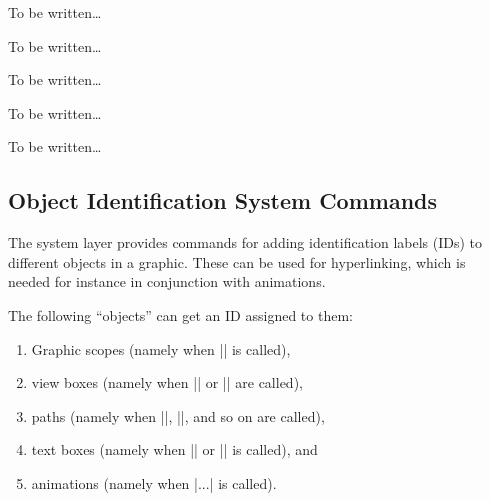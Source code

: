 \begin{command}{\pgfsys@animation@path{}}
  To be written\dots
\end{command}

\begin{command}{\pgfsys@animation@translate{}}
  To be written\dots
\end{command}

\begin{command}{\pgfsys@animation@scale{}}
  To be written\dots
\end{command}

\begin{command}{\pgfsys@animation@rotate{}}
  To be written\dots
\end{command}

\begin{command}{\pgfsys@animation@viewbox{}}
  To be written\dots
\end{command}





\subsection{Object Identification System Commands}
\label{section-sys-id}

The system layer provides commands for adding identification labels
(IDs) to different objects in a graphic. These can be used for
hyperlinking, which is needed for instance in conjunction with
animations.

The following ``objects'' can get an ID assigned to them:
\begin{enumerate}
\item Graphic scopes (namely when |\pgfsys@begin@idscope| is called),
\item view boxes (namely when |\pgfsys@viewboxmeet| or |\pgfsys@viewboxslice| are called),
\item paths (namely when |\pgfsys@fill|, |\pgfsys@stroke|, and so on are called),
\item text boxes (namely when |\pgfsys@hbox| or |\pgfsys@hboxsynced| is called), and
\item animations (namely when |\pgfsys@animate...| is called).
\end{enumerate}


